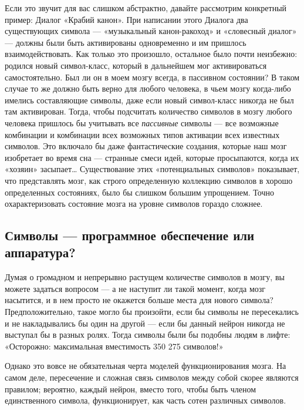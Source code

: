 \documentclass[../main.tex]{subfiles}
\begin{document}
Если это звучит для вас слишком абстрактно, давайте рассмотрим конкретный пример: Диалог «Крабий канон». При написании этого Диалога два существующих символа --- «музыкальный канон-ракоход» и «словесный диалог» --- должны были быть активированы одновременно и им пришлось взаимодействовать. Как только это произошло, остальное было почти неизбежно: родился новый символ-класс, который в дальнейшем мог активироваться самостоятельно. Был ли он в моем мозгу всегда, в пассивном состоянии? В таком случае то же должно быть верно для любого человека, в чьем мозгу когда-либо имелись составляющие символы, даже если новый символ-класс никогда не был там активирован. Тогда, чтобы подсчитать количество символов в мозгу любого человека пришлось бы учитывать все \emph{пассивные} символы --- все возможные комбинации и комбинации всех возможных типов активации всех известных символов. Это включало бы даже фантастические создания, которые наш мозг изобретает во время сна --- странные смеси идей, которые просыпаются, когда их «хозяин» засыпает\ldots{} Существование этих «потенциальных символов» показывает, что представлять мозг, как строго определенную коллекцию символов в хорошо определенных состояниях, было бы слишком большим упрощением. Точно охарактеризовать состояние мозга на уровне символов гораздо сложнее.

\subsection{Символы --- программное обеспечение или аппаратура?}

Думая о громадном и непрерывно растущем количестве символов в мозгу, вы можете задаться вопросом --- а не наступит ли такой момент, когда мозг насытится, и в нем просто не окажется больше места для нового символа? Предположительно, такое могло бы произойти, если бы символы не пересекались и не накладывались бы один на другой --- если бы данный нейрон никогда не выступал бы в разных ролях. Тогда символы были бы подобны людям в лифте: «Осторожно: максимальная вместимость 350 275 символов!»

Однако это вовсе не обязательная черта моделей функционирования мозга. На самом деле, пересечение и сложная связь символов между собой скорее являются правилом; вероятно, каждый нейрон, вместо того, чтобы быть членом единственного символа, функционирует, как часть сотен различных символов.
\end{document}
